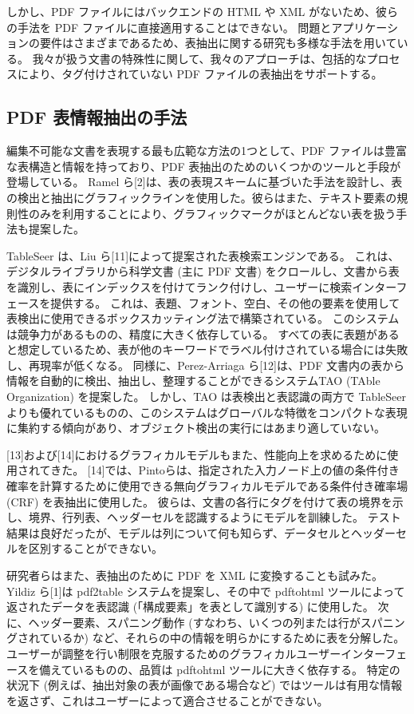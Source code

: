 \documentclass[uplatex, twocolumn,10pt]{jsarticle}
\begin{document}
しかし、PDF ファイルにはバックエンドの HTML や XML がないため、彼らの手法を PDF ファイルに直接適用することはできない。
問題とアプリケーションの要件はさまざまであるため、表抽出に関する研究も多様な手法を用いている。
我々が扱う文書の特殊性に関して、我々のアプローチは、包括的なプロセスにより、タグ付けされていない PDF ファイルの表抽出をサポートする。

\subsection{PDF 表情報抽出の手法}
編集不可能な文書を表現する最も広範な方法の1つとして、PDF ファイルは豊富な表構造と情報を持っており、PDF 表抽出のためのいくつかのツールと手段が登場している。
Ramel ら[2]は、表の表現スキームに基づいた手法を設計し、表の検出と抽出にグラフィックラインを使用した。彼らはまた、テキスト要素の規則性のみを利用することにより、グラフィックマークがほとんどない表を扱う手法も提案した。

TableSeer は、Liu ら[11]によって提案された表検索エンジンである。
これは、デジタルライブラリから科学文書 (主に PDF 文書) をクロールし、文書から表を識別し、表にインデックスを付けてランク付けし、ユーザーに検索インターフェースを提供する。
これは、表題、フォント、空白、その他の要素を使用して表検出に使用できるボックスカッティング法で構築されている。
このシステムは競争力があるものの、精度に大きく依存している。
すべての表に表題があると想定しているため、表が他のキーワードでラベル付けされている場合には失敗し、再現率が低くなる。
同様に、Perez-Arriaga ら[12]は、PDF 文書内の表から情報を自動的に検出、抽出し、整理することができるシステムTAO (TAble Organization) を提案した。
しかし、TAO は表検出と表認識の両方で TableSeer よりも優れているものの、このシステムはグローバルな特徴をコンパクトな表現に集約する傾向があり、オブジェクト検出の実行にはあまり適していない。

[13]および[14]におけるグラフィカルモデルもまた、性能向上を求めるために使用されてきた。
[14]では、Pintoらは、指定された入力ノード上の値の条件付き確率を計算するために使用できる無向グラフィカルモデルである条件付き確率場 (CRF) を表抽出に使用した。
彼らは、文書の各行にタグを付けて表の境界を示し、境界、行列表、ヘッダーセルを認識するようにモデルを訓練した。
テスト結果は良好だったが、モデルは列について何も知らず、データセルとヘッダーセルを区別することができない。

研究者らはまた、表抽出のために PDF を XML に変換することも試みた。
Yildiz ら[1]は pdf2table システムを提案し、その中で pdftohtml ツールによって返されたデータを表認識 (「構成要素」を表として識別する) に使用した。
次に、ヘッダー要素、スパニング動作 (すなわち、いくつの列または行がスパニングされているか) など、それらの中の情報を明らかにするために表を分解した。
ユーザーが調整を行い制限を克服するためのグラフィカルユーザーインターフェースを備えているものの、品質は pdftohtml ツールに大きく依存する。
特定の状況下 (例えば、抽出対象の表が画像である場合など) ではツールは有用な情報を返さず、これはユーザーによって適合させることができない。
\end{document}
